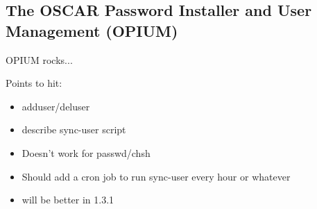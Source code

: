 %
%
%

\subsection{The OSCAR Password Installer and User Management (OPIUM)}
\label{app:opium-overview}

OPIUM rocks...

Points to hit:

\begin{itemize}
\item adduser/deluser
\item describe sync-user script
\item Doesn't work for passwd/chsh
\item Should add a cron job to run sync-user every hour or whatever
\item will be better in 1.3.1
\end{itemize}
